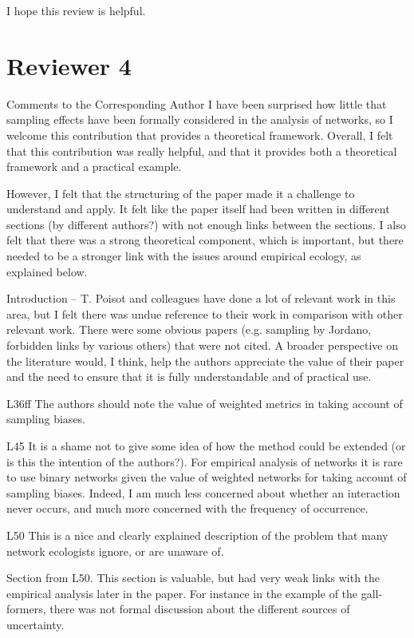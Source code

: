 I hope this review is helpful.  


\section*{Reviewer 4}

Comments to the Corresponding Author
I have been surprised how little that sampling effects have been formally considered in the analysis of networks, so I welcome this contribution that provides a theoretical framework. Overall, I felt that this contribution was really helpful, and that it provides both a theoretical framework and a practical example.

However, I felt that the structuring of the paper made it a challenge to understand and apply. It felt like the paper itself had been written in different sections (by different authors?) with not enough links between the sections. I also felt that there was a strong theoretical component, which is important, but there needed to be a stronger link with the issues around empirical ecology, as explained below.

Introduction – T. Poisot and colleagues have done a lot of relevant work in this area, but I felt there was undue reference to their work in comparison with other relevant work. There were some obvious papers (e.g. sampling by Jordano, forbidden links by various others) that were not cited. A broader perspective on the literature would, I think, help the authors appreciate the value of their paper and the need to ensure that it is fully understandable and of practical use.

L36ff The authors should note the value of weighted metrics in taking account of sampling biases.

L45 It is a shame not to give some idea of how the method could be extended (or is this the intention of the authors?). For empirical analysis of networks it is rare to use binary networks given the value of weighted networks for taking account of sampling biases. Indeed, I am much less concerned about whether an interaction never occurs, and much more concerned with the frequency of occurrence.

L50 This is a nice and clearly explained description of the problem that many network ecologists ignore, or are unaware of.

Section from L50. This section is valuable, but had very weak links with the empirical analysis later in the paper. For instance in the example of the gall-formers, there was not formal discussion about the different sources of uncertainty.

